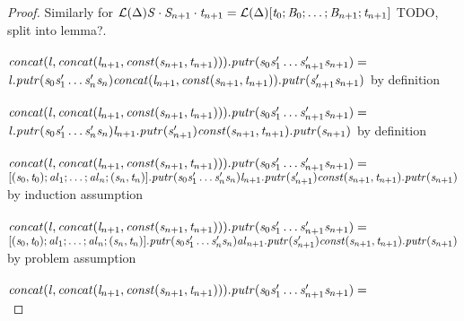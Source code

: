 \begin{lemma}
\begin{proof}
Similarly for
$\mathcal{L}(\Delta){\mathit{S}\cdot\mathit{S}_{n+1}\cdot\mathit{t}_{n+1}}
= \mathcal{L}(\Delta){[\mathit{t}_0;\mathit{B}_0;\ldots;\mathit{B}_{n+1};\mathit{t}_{n+1}]}$
 TODO, split into lemma?.\\
\\
$\mathit{concat}(\mathit{l},\mathit{concat}(\mathit{l}_{n+1},\mathit{const}(\mathit{s}_{n+1},\mathit{t}_{n+1}))).\mathit{putr}
(\mathit{s}_0\mathit{s}_1'\ldots\mathit{s}_{n+1}'\mathit{s}_{n+1}) =$\\
$\mathit{l}.\mathit{putr}(\mathit{s}_0\mathit{s}_1'\ldots\mathit{s}_n'\mathit{s}_n)\mathit{concat}(\mathit{l}_{n+1},\mathit{const}(\mathit{s}_{n+1},\mathit{t}_{n+1})).\mathit{putr}(\mathit{s}_{n+1}'\mathit{s}_{n+1})$ by definition\\
\\
$\mathit{concat}(\mathit{l},\mathit{concat}(\mathit{l}_{n+1},\mathit{const}(\mathit{s}_{n+1},\mathit{t}_{n+1}))).\mathit{putr}
(\mathit{s}_0\mathit{s}_1'\ldots\mathit{s}_{n+1}'\mathit{s}_{n+1}) =$\\
$\mathit{l}.\mathit{putr}(\mathit{s}_0\mathit{s}_1'\ldots\mathit{s}_n'\mathit{s}_n)\mathit{l}_{n+1}.\mathit{putr}(\mathit{s}_{n+1}')\mathit{const}(\mathit{s}_{n+1},\mathit{t}_{n+1}).\mathit{putr}(\mathit{s}_{n+1})$ by definition\\
\\
$\mathit{concat}(\mathit{l},\mathit{concat}(\mathit{l}_{n+1},\mathit{const}(\mathit{s}_{n+1},\mathit{t}_{n+1}))).\mathit{putr}
(\mathit{s}_0\mathit{s}_1'\ldots\mathit{s}_{n+1}'\mathit{s}_{n+1}) =$\\
$[(\mathit{s}_0,\mathit{t}_0);\mathit{al}_1;\ldots;\mathit{al}_n;(\mathit{s}_n,\mathit{t}_n)].\mathit{putr}(\mathit{s}_0\mathit{s}_1'\ldots\mathit{s}_n'\mathit{s}_n)\mathit{l}_{n+1}.\mathit{putr}(\mathit{s}_{n+1}')\mathit{const}(\mathit{s}_{n+1},\mathit{t}_{n+1}).\mathit{putr}(\mathit{s}_{n+1})$ by induction assumption\\
\\
$\mathit{concat}(\mathit{l},\mathit{concat}(\mathit{l}_{n+1},\mathit{const}(\mathit{s}_{n+1},\mathit{t}_{n+1}))).\mathit{putr}
(\mathit{s}_0\mathit{s}_1'\ldots\mathit{s}_{n+1}'\mathit{s}_{n+1}) =$\\
$[(\mathit{s}_0,\mathit{t}_0);\mathit{al}_1;\ldots;\mathit{al}_n;(\mathit{s}_n,\mathit{t}_n)].\mathit{putr}(\mathit{s}_0\mathit{s}_1'\ldots\mathit{s}_n'\mathit{s}_n)\mathit{al}_{n+1}.\mathit{putr}(\mathit{s}_{n+1}')\mathit{const}(\mathit{s}_{n+1},\mathit{t}_{n+1}).\mathit{putr}(\mathit{s}_{n+1})$ by problem assumption\\
\\
$\mathit{concat}(\mathit{l},\mathit{concat}(\mathit{l}_{n+1},\mathit{const}(\mathit{s}_{n+1},\mathit{t}_{n+1}))).\mathit{putr}
(\mathit{s}_0\mathit{s}_1'\ldots\mathit{s}_{n+1}'\mathit{s}_{n+1}) =$\\

\end{proof}
\end{lemma}
